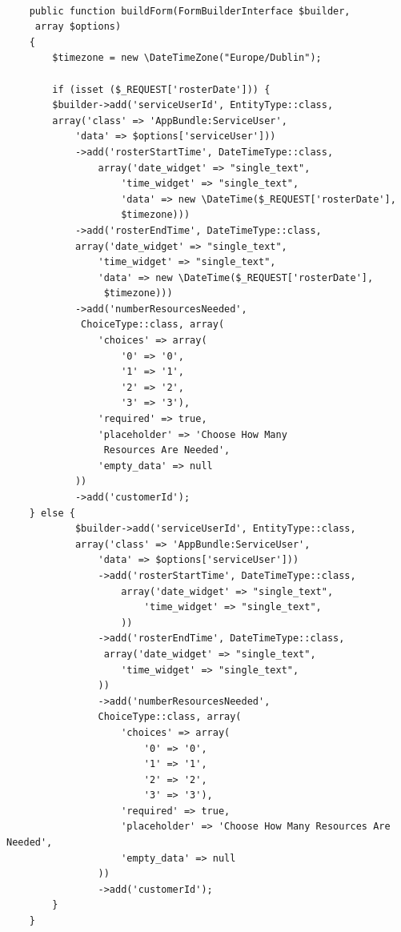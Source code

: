 \documentclass[a4paper,Times New Roman 11pt]{article}
\begin{document}
\begin{verbatim}

    public function buildForm(FormBuilderInterface $builder,
     array $options)
    {
        $timezone = new \DateTimeZone("Europe/Dublin");

        if (isset ($_REQUEST['rosterDate'])) {
        $builder->add('serviceUserId', EntityType::class, 
        array('class' => 'AppBundle:ServiceUser',
            'data' => $options['serviceUser']))
            ->add('rosterStartTime', DateTimeType::class,
                array('date_widget' => "single_text",
                    'time_widget' => "single_text",
                    'data' => new \DateTime($_REQUEST['rosterDate'], 
                    $timezone)))
            ->add('rosterEndTime', DateTimeType::class, 
            array('date_widget' => "single_text",
                'time_widget' => "single_text",
                'data' => new \DateTime($_REQUEST['rosterDate'],
                 $timezone)))
            ->add('numberResourcesNeeded',
             ChoiceType::class, array(
                'choices' => array(
                    '0' => '0',
                    '1' => '1',
                    '2' => '2',
                    '3' => '3'),
                'required' => true,
                'placeholder' => 'Choose How Many
                 Resources Are Needed',
                'empty_data' => null
            ))
            ->add('customerId');
    } else {
            $builder->add('serviceUserId', EntityType::class, 
            array('class' => 'AppBundle:ServiceUser',
                'data' => $options['serviceUser']))
                ->add('rosterStartTime', DateTimeType::class,
                    array('date_widget' => "single_text",
                        'time_widget' => "single_text",
                    ))
                ->add('rosterEndTime', DateTimeType::class,
                 array('date_widget' => "single_text",
                    'time_widget' => "single_text",
                ))
                ->add('numberResourcesNeeded', 
                ChoiceType::class, array(
                    'choices' => array(
                        '0' => '0',
                        '1' => '1',
                        '2' => '2',
                        '3' => '3'),
                    'required' => true,
                    'placeholder' => 'Choose How Many Resources Are Needed',
                    'empty_data' => null
                ))
                ->add('customerId');
        }
    }
\end{verbatim}
 
\end{document}
